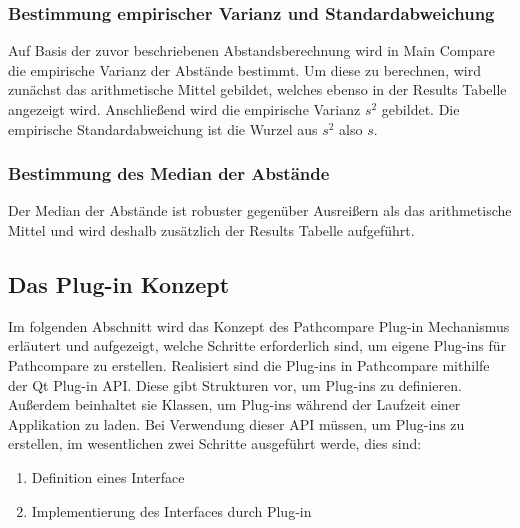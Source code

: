 
\subsubsection{Bestimmung empirischer Varianz und Standardabweichung}
Auf Basis der zuvor beschriebenen Abstandsberechnung wird in Main Compare die
empirische Varianz der Abstände bestimmt. Um diese zu berechnen, wird zunächst
das arithmetische Mittel gebildet, welches ebenso in der Results Tabelle angezeigt wird.
Anschließend wird die empirische Varianz $s^2$ gebildet. Die empirische Standardabweichung
ist die Wurzel aus $s^2$ also $s$.

\subsubsection{Bestimmung des Median der Abstände}
Der Median der Abstände ist robuster gegenüber Ausreißern als das
arithmetische Mittel und wird deshalb zusätzlich der Results Tabelle
aufgeführt.

\subsection{Das Plug-in Konzept}
Im folgenden Abschnitt wird das Konzept des Pathcompare Plug-in Mechanismus
erläutert und aufgezeigt, welche Schritte erforderlich sind, um eigene Plug-ins
für Pathcompare zu erstellen. Realisiert sind die Plug-ins in Pathcompare
mithilfe der Qt Plug-in API. Diese gibt Strukturen vor, um Plug-ins zu
definieren. Außerdem beinhaltet sie Klassen, um Plug-ins während der Laufzeit
einer Applikation zu laden.  Bei Verwendung dieser API müssen, um Plug-ins zu
erstellen, im wesentlichen zwei Schritte ausgeführt werde, dies sind:

\begin{enumerate}
  \item Definition eines Interface
  \item Implementierung des Interfaces durch Plug-in
\end{enumerate}

